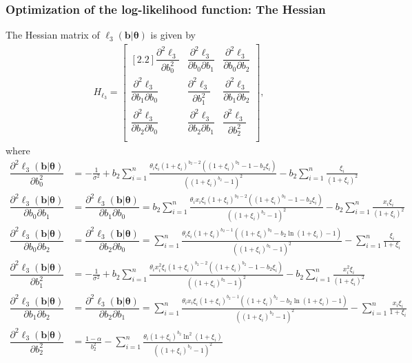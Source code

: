 \documentclass[11pt, letterpaper]{article}
\numberwithin{equation}{section}
\begin{document}
\subsubsection{Optimization of the log-likelihood function: The Hessian}
The Hessian matrix of $\ell_3(\bm b | \bm \theta)$ is given by
\begin{align*}
H_{\ell_3} = \begin{bmatrix}[2.2]
\dfrac{\partial^2 \ell_3}{\partial b_0 ^2} & \dfrac{\partial^2 \ell_3}{\partial b_0 \partial b_1} & \dfrac{\partial^2 \ell_3}{\partial b_0 \partial b_2} \\
\dfrac{\partial^2 \ell_3}{\partial b_1  \partial b_0} & \dfrac{\partial^2 \ell_3}{\partial b_1^2} & \dfrac{\partial^2 \ell_3}{\partial b_1 \partial b_2} \\
\dfrac{\partial^2 \ell_3}{\partial b_2  \partial b_0}  & \dfrac{\partial^2 \ell_3}{\partial b_2 \partial b_1} & \dfrac{\partial^2 \ell_3}{\partial b_2^2}\\
\end{bmatrix},
\end{align*}
where
\begin{align*}
\dfrac{\partial^2 \ell_3(\bm b | \bm \theta)}{\partial b_0 ^2} &=  -\frac{1}{\sigma^2} + b_2 \sum_{i=1}^n \frac{\theta_i \xi_i (1+\xi_i)^{b_2-2}((1+\xi_i)^{b_2} - 1 - b_2 \xi_i)}{\left((1+\xi_i)^{b_2} - 1 \right)^2} -b_2 \sum_{i=1}^n \frac{ \xi_i}{(1+\xi_i )^2}\\
\dfrac{\partial^2 \ell_3(\bm b | \bm \theta)}{\partial b_0 \partial b_1} &= \dfrac{\partial^2 \ell_3(\bm b | \bm \theta)}{\partial b_1 \partial b_0} =  b_2 \sum_{i=1}^n \frac{\theta_ix_i \xi_i (1+\xi_i)^{b_2-2}((1+\xi_i)^{b_2} - 1 - b_2 \xi_i)}{\left((1+\xi_i)^{b_2} - 1 \right)^2} -b_2 \sum_{i=1}^n \frac{x_i \xi_i}{(1+\xi_i )^2}\\
\dfrac{\partial^2 \ell_3(\bm b | \bm \theta)}{\partial b_0 \partial b_2} &= \dfrac{\partial^2 \ell_3(\bm b | \bm \theta)}{\partial b_2 \partial b_0} = \sum_{i=1}^n \frac{\theta_i\xi_i(1+\xi_i)^{b_2-1}\left((1+\xi_i)^{b_2}- b_2 \ln (1+\xi_i) -1 \right)}{\left((1+\xi_i)^{b_2} - 1 \right)^2} - \sum_{i=1}^n \frac{\xi_i}{1+\xi_i}\\
\dfrac{\partial^2 \ell_3(\bm b | \bm \theta)}{\partial b_1 ^2} &= -\frac{1}{\sigma^2} + b_2 \sum_{i=1}^n \frac{\theta_i x_i^2\xi_i (1+\xi_i)^{b_2-2}((1+\xi_i)^{b_2} - 1-b_2 \xi_i)}{\left((1+\xi_i)^{b_2} - 1 \right)^2} -b_2 \sum_{i=1}^n \frac{x_i^2 \xi_i}{(1+\xi_i )^2}\\
\dfrac{\partial^2 \ell_3(\bm b | \bm \theta)}{\partial b_1 \partial b_2} &= \dfrac{\partial^2 \ell_3(\bm b | \bm \theta)}{\partial b_2 \partial b_1} =  \sum_{i=1}^n \frac{\theta_i x_i\xi_i(1+\xi_i)^{b_2-1}\left((1+\xi_i)^{b_2}- b_2 \ln (1+\xi_i) -1 \right)}{\left((1+\xi_i)^{b_2} - 1 \right)^2} - \sum_{i=1}^n \frac{x_i\xi_i}{1+\xi_i}\\
\dfrac{\partial^2 \ell_3(\bm b | \bm \theta)}{\partial b_2 ^2} &= \frac{1-\alpha}{b_2^2} - \sum_{i=1}^n \frac{\theta_i(1+\xi_i)^{b_2}\ln ^2(1+\xi_i)}{\left((1+\xi_i)^{b_2} - 1 \right)^2} \\
\end{align*}
\end{document}
